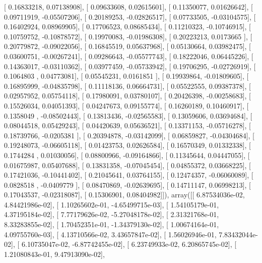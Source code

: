 \documentclass{article}
\begin{document}
       [ 0.16833218,  0.07138908],
       [ 0.09633608,  0.02615601],
       [ 0.11350077,  0.01626642],
       [ 0.09711919, -0.05507206],
       [ 0.20189253, -0.02826517],
       [ 0.07733505, -0.03104575],
       [ 0.16402924,  0.08969905],
       [ 0.17706523,  0.08685434],
       [ 0.11210323, -0.10746915],
       [ 0.10759752, -0.10878572],
       [ 0.19970083, -0.01986308],
       [ 0.20223213,  0.0173665 ],
       [ 0.20779872, -0.09022056],
       [ 0.16845519,  0.05637968],
       [ 0.05130664,  0.03982475],
       [ 0.03600751, -0.00267241],
       [ 0.09286643, -0.05577743],
       [ 0.18222046,  0.06445226],
       [ 0.14363017, -0.03110362],
       [ 0.03977459, -0.05733942],
       [ 0.19706295, -0.02726919],
       [ 0.1064803 ,  0.04773081],
       [ 0.05545231,  0.0161851 ],
       [ 0.19939864, -0.01809605],
       [ 0.16895999, -0.04835798],
       [ 0.11118136,  0.06664731],
       [ 0.05522555,  0.09387378],
       [ 0.02957952,  0.05754118],
       [ 0.17980091,  0.03780107],
       [ 0.20426398, -0.00258683],
       [ 0.15526034,  0.04051393],
       [ 0.04247673,  0.09155774],
       [ 0.16260189,  0.10460917],
       [ 0.1358049 , -0.08502443],
       [ 0.13813436, -0.02565583],
       [ 0.13059606,  0.03694684],
       [ 0.08044518,  0.05429243],
       [ 0.04420639,  0.05636521],
       [ 0.13371153, -0.05716278],
       [ 0.18739766, -0.0205381 ],
       [ 0.20394878, -0.03142099],
       [ 0.06859827, -0.04304684],
       [ 0.19248073, -0.06605118],
       [ 0.01423753,  0.02626584],
       [ 0.16570349,  0.01332338],
       [ 0.1744284 ,  0.01030056],
       [ 0.08800966, -0.09164866],
       [ 0.11345644,  0.04447055],
       [ 0.01675987,  0.05407688],
       [ 0.13831358, -0.07045454],
       [ 0.04855372,  0.03668225],
       [ 0.17421036, -0.10441402],
       [ 0.21045641,  0.03764155],
       [ 0.12474357, -0.06060089],
       [ 0.0828518 , -0.0409779 ],
       [ 0.08470869, -0.02639695],
       [ 0.14711147,  0.06998213],
       [ 0.17043537, -0.02318087],
       [ 0.15306901,  0.08404982]]), array([[  6.87534036e-02,   4.84421986e-02],
       [  1.10265602e-01,  -4.65499715e-03],
       [  1.54105179e-01,   4.37195184e-02],
       [  7.77179626e-02,  -5.27048178e-02],
       [  2.31321768e-01,   8.33283855e-02],
       [  1.70452351e-01,  -1.34379130e-02],
       [  1.00674164e-01,   4.09755760e-03],
       [  4.13710566e-02,   3.43657847e-02],
       [  1.56026946e-01,   7.83432044e-02],
       [  6.10735047e-02,  -6.87742455e-02],
       [  6.23749933e-02,   6.20865745e-02],
       [  1.21080843e-01,   9.47913090e-02],
\end{document}
